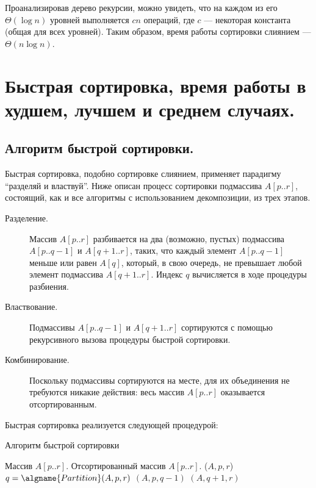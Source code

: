 \documentclass[a4paper,12pt]{article}
\begin{document}
Проанализировав дерево рекурсии, можно увидеть, что на каждом из его $\Theta(\log n)$ уровней выполняется $cn$ операций, где $c$ --- некоторая константа (общая для всех уровней). Таким образом, время работы сортировки слиянием --- $\Theta(n \log n)$.
\newpage
\section{Быстрая сортировка, время работы в худшем, лучшем и среднем случаях.}

\subsection{Алгоритм быстрой сортировки.}

Быстрая сортировка, подобно сортировке слиянием, применяет парадигму ``разделяй и властвуй''. Ниже описан процесс сортировки подмассива $A[p..r]$, состоящий, как и все алгоритмы с использованием декомпозиции, из трех этапов.

\begin{description}
	\item[Разделение.] Массив $A[p..r]$ разбивается на два (возможно, пустых) подмассива $A[p..q - 1]$ и $A[q + 1..r]$, таких, что каждый элемент $A[p..q - 1]$ меньше или равен $A[q]$, который, в свою очередь, не превышает любой элемент подмассива $A[q + 1..r]$. Индекс $q$ вычисляется в ходе процедуры разбиения.
	
	\item[Властвование.] Подмассивы $A[p..q - 1]$ и $A[q + 1..r]$ сортируются с помощью рекурсивного вызова процедуры быстрой сортировки.
	
	\item[Комбинирование.] Поскольку подмассивы сортируются на месте, для их объединения не требуются никакие действия: весь массив $A[p..r]$ оказывается
	отсортированным.
\end{description}

Быстрая сортировка реализуется следующей процедурой:

\begin{algorithm}[H]
	\caption{Алгоритм быстрой сортировки}
	\label{algo:quick-sort}
	\begin{algorithmic}[1]
		\Require Массив $A[p..r]$.
		\Ensure Отсортированный массив $A[p..r]$.
		($A, p, r$)
			\State $q = \algname{Partition}(A, p, r)$
			\State {}$(A, p, q - 1)$
			\State {}$(A, q + 1, r)$
		\EndIf
		\EndFunction
	\end{algorithmic}
\end{algorithm}
\end{document}
